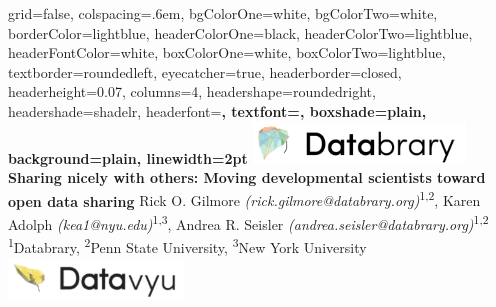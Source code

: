 \documentclass[landscape,final,paperwidth=75in,paperheight=48in,fontscale=0.285]{baposter}
\begin{document}



\begin{poster}%
  {
  grid=false,
  colspacing=.6em,      %
  bgColorOne=white,
  bgColorTwo=white,
  borderColor=lightblue,
  headerColorOne=black,
  headerColorTwo=lightblue,
  headerFontColor=white,
  boxColorOne=white,
  boxColorTwo=lightblue,
  textborder=roundedleft,
  eyecatcher=true,          %
  headerborder=closed,
  headerheight=0.07\textheight, %
  columns=4, %
  headershape=roundedright,
  headershade=shadelr,
  headerfont=\Large\bf\textsc, %
  textfont={\setlength{\parindent}{1.5em}},
  boxshade=plain,
  background=plain,
  linewidth=2pt
  }
  {
  \includegraphics[height=3em]{img/databrary.png}
  }
  {
  \vspace{-0.2ex}
  \bf{Sharing nicely with others: Moving developmental scientists toward open data sharing}
  \vspace{0.1ex}
  }
  {
  Rick O. Gilmore \emph{(rick.gilmore@databrary.org)}\textsuperscript{1,2}, Karen Adolph \emph{(kea1@nyu.edu)}\textsuperscript{1,3}, Andrea R. Seisler \emph{(andrea.seisler@databrary.org)}\textsuperscript{1,2} \\
  \smaller \textsuperscript{1}Databrary, \textsuperscript{2}Penn State University, \textsuperscript{3}New York University \\
  }
 {
 \includegraphics[height=3em]{img/datavyu.png}
 }


\end{poster}
\end{document}
